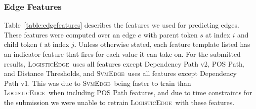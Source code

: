 \documentclass[11pt]{article}
\newcommand{\sam}[1]{\textcolor{blue}{[#1 -SMT]}}
\renewcommand{\sam}[1]{}
\newcommand{\logitedge}{\textsc{LogisticEdge}}
\newcommand{\svmedge}{\textsc{SvmEdge}}
\begin{document}
\subsubsection{Edge Features}
\label{s:edgefeatures}

\label{s:features}

\sam{would be nice to cite where we stole these features from, where applicable}
Table~\ref{table:edgefeatures} describes the features we used for predicting
edges.
These features were computed over an edge $e$ with parent token $s$ at
index $i$ and child token $t$ at index $j$. 
Unless otherwise stated, each feature template listed has an indicator
feature that fires for each value it can take on.  For the submitted results,
\logitedge~uses all features except Dependency Path v2, POS Path, and Distance
Thresholds, and \svmedge~uses all features except Dependency
Path v1.  This was due to \svmedge~being faster to
train than \logitedge~when including POS Path features, and due to time constraints for the submission we were unable to retrain
\logitedge~with these features.
\end{document}
